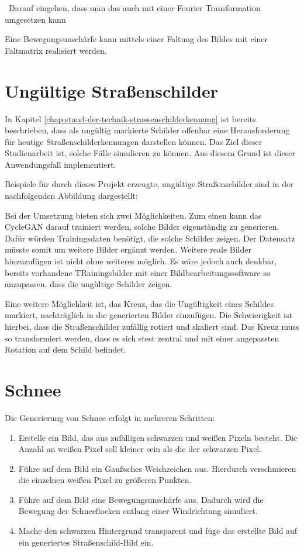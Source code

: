 

~Darauf eingehen, dass man das auch mit einer Fourier Transformation umgesetzen kann~

Eine Bewegungsunschärfe kann mittels einer Faltung des Bildes mit einer Faltmatrix realisiert werden.

\section{Ungültige Straßenschilder}
In Kapitel \ref{chap:stand-der-technik-strassenschilderkennung} ist bereits beschrieben, dass als ungültig markierte Schilder offenbar eine Herausforderung für heutige Straßenschilderkennungen darstellen können. Das Ziel dieser Studienarbeit ist, solche Fälle simulieren zu können. Aus diesem Grund ist dieser Anwendungsfall implementiert.

Beispiele für durch dieses Projekt erzeugte, ungültige Straßenschilder sind in der nachfolgenden Abbildung dargestellt:

Bei der Umsetzung bieten sich zwei Möglichkeiten. Zum einen kann das \ac{CycleGAN} darauf trainiert werden, solche Bilder eigenständig zu generieren. Dafür würden Trainingsdaten benötigt, die solche Schilder zeigen. Der Datensatz müsste somit um weitere Bilder ergänzt werden. Weitere reale Bilder hinzuzufügen ist nicht ohne weiteres möglich. Es wäre jedoch auch denkbar, bereits vorhandene TRainingsbilder mit einer Bildbearbeitungssoftware so anzupassen, dass die ungültige Schilder zeigen.

Eine weitere Möglichkeit ist, das Kreuz, das die Ungültigkeit eines Schildes markiert, nachträglich in die generierten Bilder einzufügen. Die Schwierigkeit ist hierbei, dass die Straßenschilder zufällig rotiert und skaliert sind. Das Kreuz muss so transformiert werden, dass es sich stest zentral und mit einer angepassten Rotation auf dem Schild befindet.

\section{Schnee}
Die Generierung von Schnee erfolgt in mehreren Schritten:
\begin{enumerate}
  \item Erstelle ein Bild, das aus zufälligen schwarzen und weißen Pixeln besteht. Die Anzahl an weißen Pixel soll kleiner sein als die der schwarzen Pixel.
  \item Führe auf dem Bild ein Gaußsches Weichzeichen aus. Hierdurch verschmieren die einzelnen weißen Pixel zu größeren Punkten.
  \item Führe auf dem Bild eine Bewegungsunschärfe aus. Dadurch wird die Bewegung der Schneeflocken entlang einer Windrichtung simuliert.
  \item Mache den schwarzen Hintergrund transparent und füge das erstellte Bild auf ein generiertes Straßenschild-Bild ein.
\end{enumerate}

